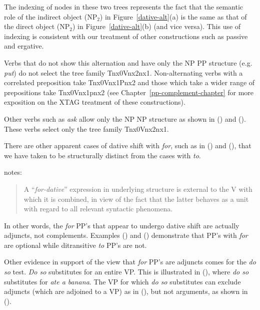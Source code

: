 The indexing of nodes in these two trees represents the fact that the semantic
role of the indirect object (NP$_2$) in Figure~\ref{dative-alt}(a) is the same
as that of the direct object (NP$_2$) in Figure~\ref{dative-alt}(b) (and vice
versa).  This use of indexing is consistent with our treatment of other
constructions such as passive and ergative.

Verbs that do not show this alternation and have only the NP PP
structure (e.g. {\it put\/}) do not select the tree family
Tnx0Vnx2nx1.  Non-alternating verbs with a correlated preposition take
Tnx0Vnx1Pnx2 and those which take a wider range of prepositions take
Tnx0Vnx1pnx2 (see Chapter~\ref{pp-complement-chapter} for more
exposition on the XTAG treatment of these constructions).  

Other verbs such as {\it ask} allow only the NP NP structure as shown
in () and ().  These verbs select only the tree family
Tnx0Vnx2nx1.


There are other apparent cases of dative shift with {\it for}, such as in
() and (), that we have taken to be structurally distinct from the
cases with {\it to}.


\cite{mccawley88} notes:

\begin{quote}
A ``{\it for-dative}'' expression in underlying structure is external
to the V with which it is combined, in view of the fact that the
latter behaves as a unit with regard to all relevant syntactic
phenomena.
\end{quote}


In other words, the {\it for} PP's that appear to undergo dative shift are
actually adjuncts, not complements. Examples () and () demonstrate
that PP's with {\it for} are optional while ditransitive {\it to} PP's are not.


Other evidence in support of the view that {\it for} PP's are adjuncts
comes for the {\it do so} test.  {\it Do so} substitutes for an entire VP. This
is illustrated in (), where {\it do so} substitutes for {\it ate a
banana}. The VP for which {\it do so} substitutes can exclude adjuncts (which
are adjoined to a VP) as in (), but not arguments, as shown in (). 

